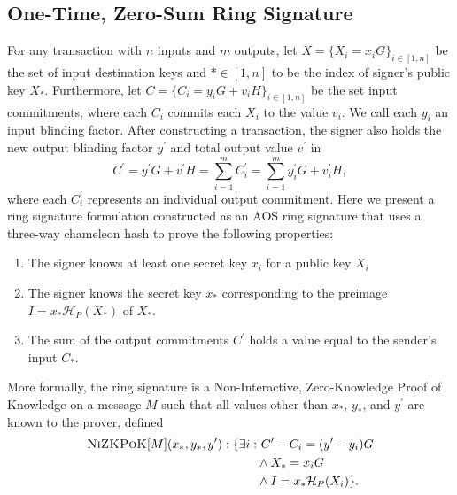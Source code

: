 \documentclass{article}
\newcommand{\algoname}[1]{\textnormal{\textsc{#1}}}
\newcommand{\nizkpok}{\algoname{NiZKPoK}}
\newcommand{\sidx}{\ensuremath{*}}
\newcommand{\pkset}{\ensuremath{X}}
\newcommand{\ix}{\ensuremath{x_i}}
\newcommand{\sx}{\ensuremath{x_\sidx}}
\newcommand{\ipk}{\ensuremath{X_i}}
\newcommand{\spk}{\ensuremath{X_\sidx}}
\newcommand{\iy}{\ensuremath{y_i}}
\newcommand{\sy}{\ensuremath{y_\sidx}}
\newcommand{\oy}{\ensuremath{y^\prime}}
\newcommand{\oiy}{\ensuremath{y^\prime_i}}
\newcommand{\iC}{\ensuremath{C_i}}
\newcommand{\sC}{\ensuremath{C_\sidx}}
\newcommand{\oC}{\ensuremath{C^\prime}}
\newcommand{\oiC}{\ensuremath{C^\prime_i}}
\newcommand{\iv}{\ensuremath{v_i}}
\newcommand{\ov}{\ensuremath{v^\prime}}
\newcommand{\oiv}{\ensuremath{v^\prime_i}}
\newcommand{\hp}{\ensuremath{\mathcal{H}_P}}
\begin{document}
\subsection{One-Time, Zero-Sum Ring Signature}

For any transaction with $n$ inputs and $m$ outputs, let $\pkset = \{ \ipk = \ix
G\}_{i \in [1,n]}$ be the set of input destination keys and $\sidx \in [1,n]$ to
be the index of signer's public key {\spk}.  Furthermore, let $C = \{ {\iC} =
{\iy} G + \iv H \}_{i \in [1,n]}$ be the set input commitments, where each $\iC$
commits each {\ipk} to the value {\iv}.  We call each {\iy} an input blinding
factor.  After constructing a transaction, the signer also holds the new output
blinding factor {\oy} and total output value {\ov} in
\[ \oC = \oy G + \ov H = \sum_{i=1}^{m} \oiC = \sum_{i=1}^m \oiy G + \oiv H ,\]
where each $\oiC$ represents an individual output commitment.  Here we present
a ring signature formulation constructed as an AOS ring signature \cite{AOS02}
that uses a three-way chameleon hash to prove the following properties:
\begin{enumerate}
  \item The signer knows at least one secret key {\ix} for a public key {\ipk}

  \item The signer knows the secret key {\sx} corresponding to the preimage $I =
  {\sx} \hp({\spk})$ of {\spk}.

  \item The sum of the output commitments {\oC} holds a value equal to the
  sender's input {\sC}.
\end{enumerate}
More formally, the ring signature is a Non-Interactive, Zero-Knowledge Proof of
Knowledge on a message $M$ such that all values other than {\sx}, {\sy}, and
{\oy} are known to the prover, defined 
\begin{align*}
\nizkpok[M](\sx, \sy, \oy) : \{ \exists i : 
& ~ \oC - \iC = (\oy - \iy)G \\
& \land \spk = \ix G \\
& \land I = \sx \hp(\ipk)\}.
\end{align*}
\end{document}
